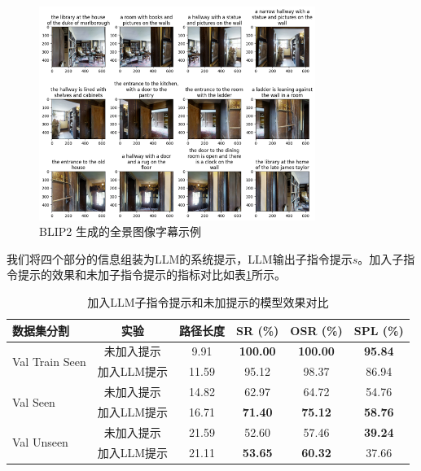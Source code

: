 \documentclass[bachelor]{thesis-uestc}
\begin{document}
\begin {figure}[h]
\centering %
\includegraphics[width=0.8\textwidth]{2635-042816.png}
\caption{BLIP2 生成的全景图像字幕示例} %
\label{cap}
\end {figure}

我们将四个部分的信息组装为LLM的系统提示，LLM输出子指令提示$s$。加入子指令提示的效果和未加子指令提示的指标对比如表\ref{llms}所示。

\begin{table}[htbp]
    \centering
    \caption{加入LLM子指令提示和未加提示的模型效果对比}
    \label{llms}
    \begin{tabular}{@{}lccccc@{}}
    \toprule
    \textbf{数据集分割} & \textbf{实验} & \textbf{路径长度} & \textbf{SR (\%)} & \textbf{OSR (\%)} & \textbf{SPL (\%)} \\ \midrule
    \multirow{2}{*}{Val Train Seen} & 未加入提示 & 9.91 & \textbf{100.00} & \textbf{100.00} & \textbf{95.84} \\
                                    & 加入LLM提示 & 11.59 & 95.12 & 98.37 & 86.94 \\ \midrule
    \multirow{2}{*}{Val Seen}       & 未加入提示 & 14.82 & 62.97 & 64.72 & 54.76 \\
                                    & 加入LLM提示 & 16.71 & \textbf{71.40} & \textbf{75.12} & \textbf{58.76} \\ \midrule
    \multirow{2}{*}{Val Unseen}     & 未加入提示 & 21.59 & 52.60 & 57.46 & \textbf{39.24} \\
                                    & 加入LLM提示 & 21.11 & \textbf{53.65} & \textbf{60.32} & 37.66 \\
    \bottomrule
    \end{tabular}
\end{table}
\end{document}
